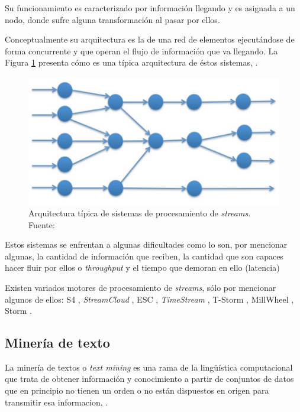 Su funcionamiento es caracterizado por información llegando y es asignada a un nodo, donde sufre alguna transformación al pasar por ellos. 

Conceptualmente su arquitectura es la de una red de elementos ejecutándose de forma concurrente y que operan el flujo de información que va llegando. La Figura \ref{fig:ArqSPS} presenta cómo es una típica arquitectura de éstos sistemas, \cite{SPExplained}.

\begin{figure}[H]
	\centering
	\captionsetup{justification=centering}
	\includegraphics[scale=0.8]{images/ArqSPS.png}
	\caption[Arquitectura típica de sistemas de procesamiento de \textit{streams}.]{Arquitectura típica de sistemas de procesamiento de \textit{streams}.\\Fuente: \cite{SPExplained}}
	\label{fig:ArqSPS}
\end{figure}

Estos sistemas se enfrentan a algunas dificultades como lo son, por mencionar algunas, la cantidad de información que reciben, la cantidad que son capaces hacer fluir por ellos o \textit{throughput} y el tiempo que demoran en ello (latencia)

Existen variados motores de procesamiento de \textit{streams}, sólo por mencionar algunos de ellos: S4 \cite{NeumeyerS4}, \textit{StreamCloud} \cite{GulisanoStreamCloud}, ESC \cite{SatzgerESC}, \textit{TimeStream} \cite{QianTimeStream}, T-Storm \cite{XuTStorm}, MillWheel \cite{AkidauMillWheel}, Storm \cite{StormFigure}.


\subsection{Minería de texto}
\label{subsec:MineriaTexto}

La minería de textos o \textit{text mining} es una rama de la lingüística computacional que trata de obtener información y conocimiento a partir de conjuntos de datos que en principio no tienen un orden o no están dispuestos en origen para transmitir esa informacion, \cite{IvanFernandez}.


